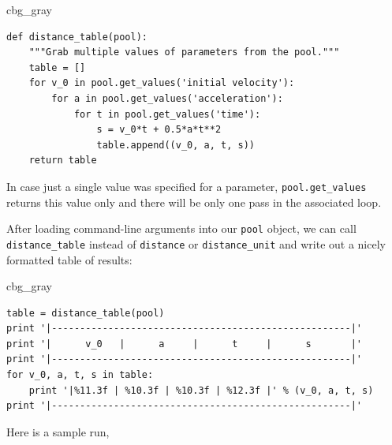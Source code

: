 \documentclass[graybox,envcountchap,sectrefs,final]{svmonodo}
\newenvironment{_cod_tight}[1]{
   \def\FrameCommand{\colorbox{#1}}
   \FrameRule0.6pt\MakeFramed {\FrameRestore}\vskip3mm}
   {\vskip0mm\endMakeFramed}
\newenvironment{cod}[1]{
\bgroup\rmfamily
\fboxsep=0mm\relax
\begin{_cod_tight}{#1}
\list{}{\parsep=-2mm\parskip=0mm\topsep=0pt\leftmargin=2mm
\rightmargin=2\leftmargin\leftmargin=4pt\relax}
\item\relax}
{\endlist\end{_cod_tight}\egroup}
\begin{document}
\begin{cod}{cbg_gray}\begin{Verbatim}[numbers=none,fontsize=\fontsize{9pt}{9pt},baselinestretch=0.95,xleftmargin=2mm]
def distance_table(pool):
    """Grab multiple values of parameters from the pool."""
    table = []
    for v_0 in pool.get_values('initial velocity'):
        for a in pool.get_values('acceleration'):
            for t in pool.get_values('time'):
                s = v_0*t + 0.5*a*t**2
                table.append((v_0, a, t, s))
    return table
\end{Verbatim}
\end{cod}
\noindent
In case just a single value was specified for a parameter, \Verb!pool.get_values!
returns this value only and there will be only one pass in the associated
loop.

After loading command-line arguments into our \texttt{pool} object, we can call
\Verb!distance_table! instead of \texttt{distance} or \Verb!distance_unit! and
write out a nicely formatted table of results:

\begin{cod}{cbg_gray}\begin{Verbatim}[numbers=none,fontsize=\fontsize{9pt}{9pt},baselinestretch=0.95,xleftmargin=2mm]
table = distance_table(pool)
print '|-----------------------------------------------------|'
print '|      v_0   |      a     |      t     |      s       |'
print '|-----------------------------------------------------|'
for v_0, a, t, s in table:
    print '|%11.3f | %10.3f | %10.3f | %12.3f |' % (v_0, a, t, s)
print '|-----------------------------------------------------|'
\end{Verbatim}
\end{cod}
\noindent
Here is a sample run,
\end{document}

